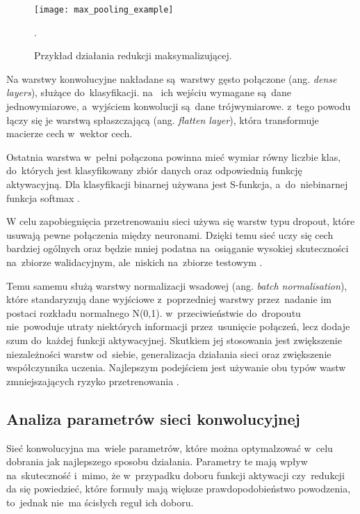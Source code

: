 {\begin{figure}[H]
	\centering
	\centering
		\texttt{[image: max\_pooling\_example]}	
	\caption{Przykład działania redukcji maksymalizującej.}.
	\label{fig:max_pooling_example}
\end{figure}


Na warstwy konwolucyjne nakładane są~warstwy gęsto połączone (ang. \textit{dense layers}), służące do~klasyfikacji. na~ ich wejściu wymagane są~dane jednowymiarowe, a~wyjściem konwolucji są~dane trójwymiarowe. z~tego powodu łączy się je warstwą spłaszczającą (ang. \textit{flatten layer}), która transformuje macierze cech w~wektor cech.

Ostatnia warstwa w~pełni połączona powinna mieć wymiar równy liczbie klas, do~których jest klasyfikowany zbiór danych oraz odpowiednią funkcję aktywacyjną. Dla klasyfikacji binarnej używana jest S-funkcja, a~do~niebinarnej funkcja softmax \cite{Chollet2017DeepLW}.

W celu zapobiegnięcia przetrenowaniu sieci używa się warstw typu dropout, które usuwają pewne połączenia między neuronami. Dzięki temu sieć uczy się cech bardziej ogólnych oraz będzie mniej podatna na~osiąganie wysokiej skuteczności na~zbiorze walidacyjnym, ale~niskich na~zbiorze testowym \cite{Srivastava2014DropoutAS}.

Temu samemu służą warstwy normalizacji wsadowej (ang. \textit{batch normalisation}), które standaryzują dane wyjściowe z~poprzedniej warstwy przez~nadanie im postaci rozkładu normalnego N(0,1). w~przeciwieństwie do~dropoutu nie~powoduje utraty niektórych informacji przez~usunięcie połączeń, lecz dodaje szum do~każdej funkcji aktywacyjnej. Skutkiem jej stosowania jest zwiększenie niezależności warstw od~siebie, generalizacja działania sieci oraz zwiększenie współczynnika uczenia. Najlepszym podejściem jest używanie obu typów wastw zmniejszających ryzyko przetrenowania \cite{Ioffe2015BatchNA}.
}

\subsection{Analiza parametrów sieci konwolucyjnej}

Sieć konwolucyjna ma~wiele parametrów, które można optymalzować w~celu dobrania jak najlepszego sposobu działania. Parametry te mają wpływ na~skuteczność i~mimo, że w~przypadku doboru funkcji aktywacji czy~redukcji da się powiedzieć, które formuły mają większe prawdopodobieństwo powodzenia, to~jednak nie~ma ścisłych reguł ich doboru.

